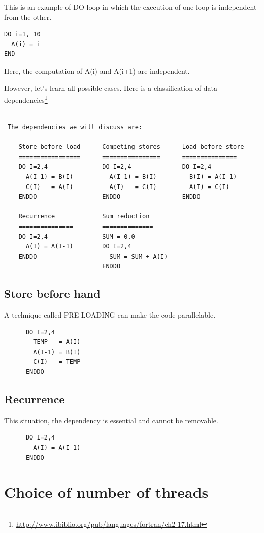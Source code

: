 This is an example of DO loop in which the execution of one loop is
independent from the other.
\begin{lstlisting}
DO i=1, 10
  A(i) = i
END
\end{lstlisting}
Here, the computation of A(i) and A(i+1) are independent.

However, let's learn all possible cases.  Here is a classification of
data dependencies\footnote{\url{http://www.ibiblio.org/pub/languages/fortran/ch2-17.html}}
\begin{verbatim}
 ------------------------------
 The dependencies we will discuss are: 

    Store before load      Competing stores      Load before store
    =================      ================      ===============
    DO I=2,4               DO I=2,4              DO I=2,4        
      A(I-1) = B(I)          A(I-1) = B(I)         B(I) = A(I-1) 
      C(I)   = A(I)          A(I)   = C(I)         A(I) = C(I)   
    ENDDO                  ENDDO                 ENDDO           

    Recurrence             Sum reduction
    ===============        ==============
    DO I=2,4               SUM = 0.0
      A(I) = A(I-1)        DO I=2,4
    ENDDO                    SUM = SUM + A(I)
                           ENDDO
\end{verbatim}

\subsection{Store before hand}
\label{sec:store-before-hand}

A technique called PRE-LOADING can make the code parallelable.
\begin{lstlisting}
      DO I=2,4
        TEMP   = A(I)
        A(I-1) = B(I)
        C(I)   = TEMP
      ENDDO
\end{lstlisting}

\subsection{Recurrence}
\label{sec:recurrence}

This situation, the dependency is essential and cannot be removable.
\begin{lstlisting}
      DO I=2,4          
        A(I) = A(I-1)   
      ENDDO            
\end{lstlisting}

\section{Choice of number of threads}
\label{sec:choice-numb-thre}

